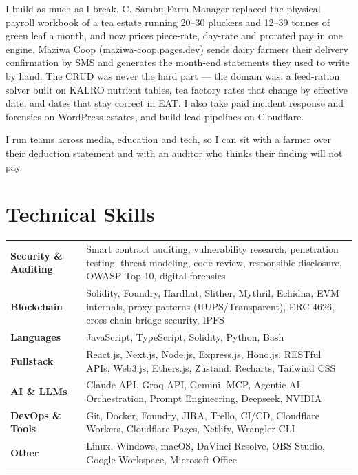 \documentclass[10pt,a4paper]{article}
\begin{document}
I build as much as I break. C. Sambu Farm Manager replaced the physical payroll workbook of a tea estate running 20--30 pluckers and 12--39 tonnes of green leaf a month, and now prices piece-rate, day-rate and prorated pay in one engine. Maziwa Coop (\href{https://maziwa-coop.pages.dev}{maziwa-coop.pages.dev}) sends dairy farmers their delivery confirmation by SMS and generates the month-end statements they used to write by hand. The CRUD was never the hard part --- the domain was: a feed-ration solver built on KALRO nutrient tables, tea factory rates that change by effective date, and dates that stay correct in EAT. I also take paid incident response and forensics on WordPress estates, and build lead pipelines on Cloudflare.

I run teams across media, education and tech, so I can sit with a farmer over their deduction statement and with an auditor who thinks their finding will not pay.
\setlength{\parskip}{0pt}
\normalsize

\section{Technical Skills}

\small
\renewcommand{\arraystretch}{1.25}
\begin{tabular}{>{\bfseries}p{3.2cm} p{13cm}}
Security \& Auditing & Smart contract auditing, vulnerability research, penetration testing, threat modeling, code review, responsible disclosure, OWASP Top 10, digital forensics \\
Blockchain & Solidity, Foundry, Hardhat, Slither, Mythril, Echidna, EVM internals, proxy patterns (UUPS/Transparent), ERC-4626, cross-chain bridge security, IPFS \\
Languages & JavaScript, TypeScript, Solidity, Python, Bash \\
Fullstack & React.js, Next.js, Node.js, Express.js, Hono.js, RESTful APIs, Web3.js, Ethers.js, Zustand, Recharts, Tailwind CSS \\
AI \& LLMs & Claude API, Groq API, Gemini, MCP, Agentic AI Orchestration, Prompt Engineering, Deepseek, NVIDIA \\
DevOps \& Tools & Git, Docker, Foundry, JIRA, Trello, CI/CD, Cloudflare Workers, Cloudflare Pages, Netlify, Wrangler CLI \\
Other & Linux, Windows, macOS, DaVinci Resolve, OBS Studio, Google Workspace, Microsoft Office \\
\end{tabular}
\normalsize
\end{document}
